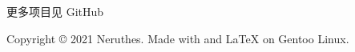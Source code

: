     \hfill
    \begin{minipage}[t]{50mm}
        \raggedright


        
        \vspace{25pt}
        
        \footnotesize
        更多项目见 GitHub
    \end{minipage}










    \vfill

    \begin{minipage}[t]{\textwidth}
        \footnotesize

        Copyright {\copyright} 2021 Neruthes.
        Made with  and {\LaTeX} on Gentoo Linux.
    \end{minipage}









